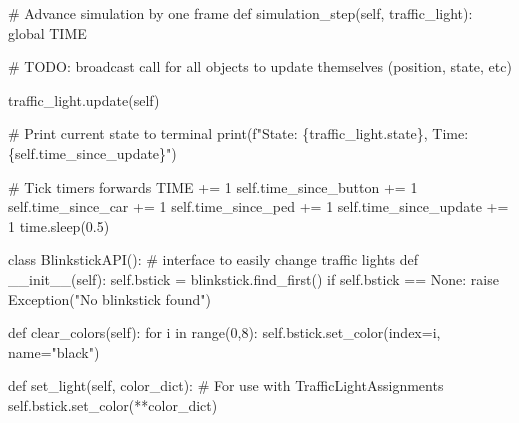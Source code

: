 \documentclass[
  letterpaper,
  DIV=11,
  numbers=noendperiod]{scrartcl}
\newenvironment{Shaded}{\begin{snugshade}}{\end{snugshade}}
\newcommand{\AlertTok}[1]{\textcolor[rgb]{0.68,0.00,0.00}{#1}}
\newcommand{\BuiltInTok}[1]{\textcolor[rgb]{0.00,0.23,0.31}{#1}}
\newcommand{\CommentTok}[1]{\textcolor[rgb]{0.37,0.37,0.37}{#1}}
\newcommand{\ControlFlowTok}[1]{\textcolor[rgb]{0.00,0.23,0.31}{#1}}
\newcommand{\DecValTok}[1]{\textcolor[rgb]{0.68,0.00,0.00}{#1}}
\newcommand{\FloatTok}[1]{\textcolor[rgb]{0.68,0.00,0.00}{#1}}
\newcommand{\FunctionTok}[1]{\textcolor[rgb]{0.28,0.35,0.67}{#1}}
\newcommand{\KeywordTok}[1]{\textcolor[rgb]{0.00,0.23,0.31}{#1}}
\newcommand{\NormalTok}[1]{\textcolor[rgb]{0.00,0.23,0.31}{#1}}
\newcommand{\OperatorTok}[1]{\textcolor[rgb]{0.37,0.37,0.37}{#1}}
\newcommand{\PreprocessorTok}[1]{\textcolor[rgb]{0.68,0.00,0.00}{#1}}
\newcommand{\SpecialCharTok}[1]{\textcolor[rgb]{0.37,0.37,0.37}{#1}}
\newcommand{\SpecialStringTok}[1]{\textcolor[rgb]{0.13,0.47,0.30}{#1}}
\newcommand{\StringTok}[1]{\textcolor[rgb]{0.13,0.47,0.30}{#1}}
\newcommand{\VariableTok}[1]{\textcolor[rgb]{0.07,0.07,0.07}{#1}}
\begin{document}
\begin{Shaded}
\begin{Highlighting}[]
    \CommentTok{\# Advance simulation by one frame}
    \KeywordTok{def}\NormalTok{ simulation\_step(}\VariableTok{self}\NormalTok{, traffic\_light):  }
        \KeywordTok{global}\NormalTok{ TIME}

        \CommentTok{\# }\AlertTok{TODO}\CommentTok{: broadcast call for all objects to update themselves (position, state, etc)}

\NormalTok{        traffic\_light.update(}\VariableTok{self}\NormalTok{)}

        \CommentTok{\# Print current state to terminal}
        \BuiltInTok{print}\NormalTok{(}\SpecialStringTok{f"State: }\SpecialCharTok{\{}\NormalTok{traffic\_light}\SpecialCharTok{.}\NormalTok{state}\SpecialCharTok{\}}\SpecialStringTok{, Time: }\SpecialCharTok{\{}\VariableTok{self}\SpecialCharTok{.}\NormalTok{time\_since\_update}\SpecialCharTok{\}}\SpecialStringTok{"}\NormalTok{)}
        
        \CommentTok{\# Tick timers forwards}
\NormalTok{        TIME }\OperatorTok{+=} \DecValTok{1}
        \VariableTok{self}\NormalTok{.time\_since\_button }\OperatorTok{+=} \DecValTok{1}
        \VariableTok{self}\NormalTok{.time\_since\_car }\OperatorTok{+=} \DecValTok{1}
        \VariableTok{self}\NormalTok{.time\_since\_ped }\OperatorTok{+=} \DecValTok{1}
        \VariableTok{self}\NormalTok{.time\_since\_update }\OperatorTok{+=} \DecValTok{1}
\NormalTok{        time.sleep(}\FloatTok{0.5}\NormalTok{)}

\KeywordTok{class}\NormalTok{ BlinkstickAPI():}
    \CommentTok{\# interface to easily change traffic lights}
    \KeywordTok{def} \FunctionTok{\_\_init\_\_}\NormalTok{(}\VariableTok{self}\NormalTok{):}
        \VariableTok{self}\NormalTok{.bstick }\OperatorTok{=}\NormalTok{ blinkstick.find\_first()}
        \ControlFlowTok{if} \VariableTok{self}\NormalTok{.bstick }\OperatorTok{==} \VariableTok{None}\NormalTok{: }
            \ControlFlowTok{raise} \PreprocessorTok{Exception}\NormalTok{(}\StringTok{"No blinkstick found"}\NormalTok{)}
    
    \KeywordTok{def}\NormalTok{ clear\_colors(}\VariableTok{self}\NormalTok{):}
        \ControlFlowTok{for}\NormalTok{ i }\KeywordTok{in} \BuiltInTok{range}\NormalTok{(}\DecValTok{0}\NormalTok{,}\DecValTok{8}\NormalTok{):}
            \VariableTok{self}\NormalTok{.bstick.set\_color(index}\OperatorTok{=}\NormalTok{i, name}\OperatorTok{=}\StringTok{"black"}\NormalTok{)}
    
    \KeywordTok{def}\NormalTok{ set\_light(}\VariableTok{self}\NormalTok{, color\_dict):}
        \CommentTok{\# For use with TrafficLightAssignments}
        \VariableTok{self}\NormalTok{.bstick.set\_color(}\OperatorTok{**}\NormalTok{color\_dict)}
    


\end{Highlighting}
\end{Shaded}
\end{document}
